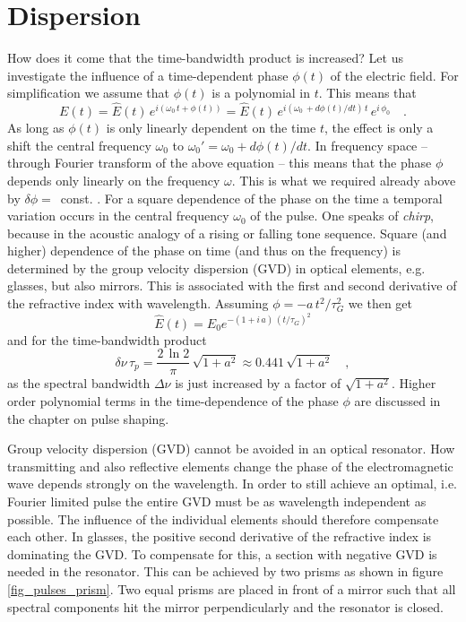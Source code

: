 \section{Dispersion}

How does it come that the time-bandwidth product is increased? 
Let us investigate the  influence of a time-dependent phase $\phi(t)$
of the electric field. For simplification we 
assume that $\phi(t)$ is a polynomial in $t$. This means that
\begin{equation}
  E(t) = \hat{E}(t) \, e^{i ( \omega_0 \, t + \phi(t))}
  = \hat{E}(t) \, e^{i ( \omega_0 \, + d\phi(t)/dt) \, t} \, e^{i
  \, \phi_0}  \quad . \label{gl_theo_nlo_ml_field_with_phase}
\end{equation}
As long as $\phi(t)$ is only linearly dependent on the time $t$, the effect is
 only a shift the central frequency $\omega_0$ to
$\omega_0' = \omega_0 + d\phi(t)/dt$.  In frequency space -- through
Fourier transform of the above equation --  this means that the
phase $\phi$ depends only linearly on the frequency $\omega$. This
is what we required already above by  
$\delta \phi =$~const. . For a square
dependence of the phase on the time a temporal variation occurs
in the central frequency $\omega_0$ of the pulse. One  speaks
of \emph{chirp}, because in the acoustic analogy of a
rising or falling tone sequence. Square
(and higher) dependence of the phase on time (and thus on
the frequency) is determined by the group velocity dispersion
(GVD) in optical elements,
e.g. glasses, but also mirrors. This is associated with the
first and second derivative of the refractive index with 
wavelength. Assuming $\phi = - a \,
t^2 / \tau_G^2$ we then get
\begin{equation}
  \hat{E}(t) = \hat{E}_0 e^{- (1 + i \, a) \, ( t / \tau_G ) ^2} \label{eq:fwm_chirp}
\end{equation}
and for the time-bandwidth product
\begin{equation}
  \delta \nu \, \tau_p = \frac{2 \, \ln 2}{\pi} \, \sqrt{1 + a^2} \approx
  0.441 \, \sqrt{1 + a^2} \quad ,
\end{equation}
as the spectral bandwidth $\Delta \nu$ is just increased by a factor of
$\sqrt{1 + a^2}$. Higher order polynomial terms in the time-dependence of the phase $\phi$ are discussed in the chapter on  pulse shaping.



Group velocity dispersion (GVD) cannot be avoided  in an
optical resonator. How transmitting and
also reflective elements change the phase of the
electromagnetic wave  depends strongly on the wavelength. In order to still achieve an optimal, i.e. Fourier limited pulse
the entire GVD must be as wavelength independent as possible. The influence of the individual elements should therefore 
compensate  each other. In glasses, the positive second derivative of the refractive index
is dominating  the GVD. To compensate for this, a section with
negative GVD is needed in the resonator. This can be  achieved by two prisms as shown in figure
\ref{fig_pulses_prism}. Two equal
prisms are placed in front of a mirror such 
that all spectral components hit the mirror perpendicularly
and  the resonator is closed.  

